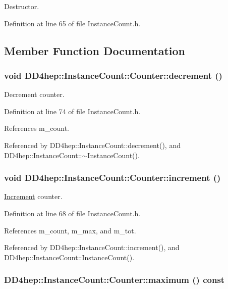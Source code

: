 Destructor. 

Definition at line 65 of file InstanceCount.h.

\subsection{Member Function Documentation}
\hypertarget{class_d_d4hep_1_1_instance_count_1_1_counter_abe6d3ce948fd3c9a990054bf44737054}{
\subsubsection[{decrement}]{\setlength{\rightskip}{0pt plus 5cm}void DD4hep::InstanceCount::Counter::decrement ()}}
\label{class_d_d4hep_1_1_instance_count_1_1_counter_abe6d3ce948fd3c9a990054bf44737054}


Decrement counter. 

Definition at line 74 of file InstanceCount.h.

References m\_\-count.

Referenced by DD4hep::InstanceCount::decrement(), and DD4hep::InstanceCount::$\sim$InstanceCount().\hypertarget{class_d_d4hep_1_1_instance_count_1_1_counter_aa127bfbbe011428fcbbeeaa7dfd25e1e}{
\subsubsection[{increment}]{\setlength{\rightskip}{0pt plus 5cm}void DD4hep::InstanceCount::Counter::increment ()}}
\label{class_d_d4hep_1_1_instance_count_1_1_counter_aa127bfbbe011428fcbbeeaa7dfd25e1e}


\hyperlink{struct_d_d4hep_1_1_increment}{Increment} counter. 

Definition at line 68 of file InstanceCount.h.

References m\_\-count, m\_\-max, and m\_\-tot.

Referenced by DD4hep::InstanceCount::increment(), and DD4hep::InstanceCount::InstanceCount().\hypertarget{class_d_d4hep_1_1_instance_count_1_1_counter_aa5152b417f85b83a1f73231856f20a4f}{
\subsubsection[{maximum}]{ DD4hep::InstanceCount::Counter::maximum () const}}
\label{class_d_d4hep_1_1_instance_count_1_1_counter_aa5152b417f85b83a1f73231856f20a4f}


